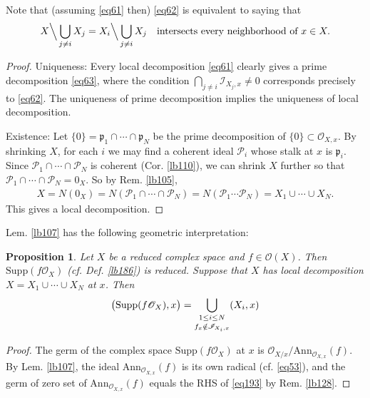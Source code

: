 \documentclass[12pt,b5paper,notitlepage]{report}
\theoremstyle{definition}
\theoremstyle{plain}
\newtheorem{pp}[df]{Proposition}
\newcommand{\scr}{\mathscr}
\newcommand{\pk}{\mathfrak p}
\newcommand{\Ann}{\mathrm{Ann}}
\newcommand{\Supp}{\mathrm{Supp}}
\numberwithin{equation}{section}
\begin{document}
Note that (assuming \eqref{eq61} then) \eqref{eq62} is equivalent to saying that
\begin{align}\label{eq64}
X\Big\backslash \bigcup_{j\neq i}X_j=X_i\Big\backslash \bigcup_{j\neq i}X_j\quad\text{intersects every neighborhood of }x\in X.
\end{align}


\begin{proof}
Uniqueness: Every local decomposition \eqref{eq61} clearly gives a prime decomposition \eqref{eq63}, where the condition $\bigcap_{j\neq i}\scr I_{X_j,x}\neq 0$ corresponds precisely to \eqref{eq62}. The uniqueness of prime decomposition implies the uniqueness of local decomposition.

Existence: Let $\{0\}=\pk_1\cap\cdots\cap\pk_N$ be the prime decomposition of $\{0\}\subset\scr O_{X,x}$. By shrinking $X$, for each $i$ we may find a coherent ideal $\scr P_i$ whose stalk at $x$ is $\pk_i$. Since $\scr P_1\cap\cdots\cap\scr P_N$ is coherent (Cor. \ref{lb110}), we can shrink $X$ further so that $\scr P_1\cap\cdots\cap\scr P_N=0_X$. So by Rem. \ref{lb105},
\begin{align*}
X=N(0_X)=N(\scr P_1\cap\cdots\cap\scr P_N)=N(\scr P_1\cdots\scr P_N)=X_1\cup\cdots\cup X_N.
\end{align*}
This gives a local decomposition.
\end{proof}


Lem. \ref{lb107} has the following geometric interpretation:

\begin{pp}\label{lb378}
Let $X$ be a reduced complex space and $f\in\scr O(X)$. Then $\Supp(f\scr O_X)$ (cf. Def. \ref{lb186}) is reduced. Suppose that $X$ has local decomposition $X=X_1\cup\cdots\cup X_N$ at $x$. Then 
\begin{align}\label{eq193}
\big(\Supp(f\scr O_X),x\big)=\bigcup_{
\begin{subarray}{c}
1\leq i\leq N\\[0.3ex]
f_x\notin\scr I_{X_i,x}
\end{subarray}
} (X_i,x)
\end{align}
\end{pp}

\begin{proof}
The germ of the complex space $\Supp(f\scr O_X)$ at $x$ is $\scr O_{X/x}/\Ann_{\scr O_{X,x}}(f)$. By Lem. \ref{lb107}, the ideal $\Ann_{\scr O_{X,x}}(f)$ is its own radical (cf. \eqref{eq53}), and the germ of zero set of $\Ann_{\scr O_{X,x}}(f)$ equals the RHS of \eqref{eq193} by Rem. \ref{lb128}.
\end{proof}
\end{document}
